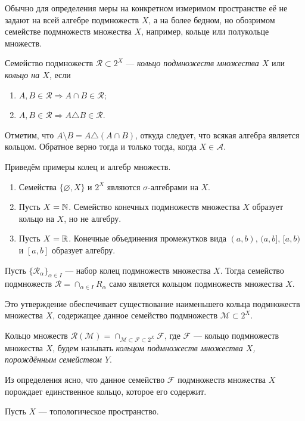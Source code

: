 Обычно для определения меры на конкретном измеримом пространстве её не задают на всей алгебре подмножеств $X$, а на более бедном, но обозримом семействе подмножеств множества $X$, например, кольце или полукольце множеств.
\begin{defin}
	Семейство подмножеств $\mathcal{R}\subset 2^X$ --- \textit{кольцо подмножеств множества $X$} или \textit{кольцо на $X$}, если
	\begin{enumerate}
		\item $A,B\in\mathcal{R}\Rightarrow A\cap B\in\mathcal{R}$;
		\item $A,B\in\mathcal{R}\Rightarrow A\triangle B\in\mathcal{R}$.
	\end{enumerate}
\end{defin}
Отметим, что $A\setminus B=A\triangle(A\cap B)$, откуда следует, что всякая алгебра является кольцом. Обратное верно тогда и только тогда, когда $X\in\mathcal{A}$.

Приведём примеры колец и алгебр множеств.
\begin{enumerate}
	\item Семейства $\{\varnothing, X\}$ и $2^X$ являются $\sigma$-алгебрами на $X$.
	\item Пусть $X=\mathbb {N}$. Семейство конечных подмножеств множества $X$ образует кольцо на $X$, но не алгебру.
	\item Пусть $X=\mathbb {R}$. Конечные объединения промежутков вида $(a,b)$, $(a,b]$, $[a,b)$ и $[a,b]$ образует алгебру.
\end{enumerate}

\begin{prop}
	Пусть $\{\mathcal{R}_{\alpha}\}_{\alpha\in I}$ --- набор колец подмножеств множества $X$. Тогда семейство подмножеств $\mathcal{R}=\displaystyle\cap_{\alpha\in I} R_{\alpha}$ само является кольцом подмножеств множества $X$.
\end{prop}
Это утверждение обеспечивает существование наименьшего кольца подмножеств множества $X$, содержащее данное семейство подмножеств $\mathcal{M}\subset 2^X$.
\begin{defin}
	Кольцо множеств $\mathcal{R}(\mathcal{M})=\displaystyle\cap_{\mathcal{M}\subset\mathcal{F}\subset 2^X} \mathcal{F}$, где $\mathcal{F}$ --- кольцо подмножеств множества $X$, будем называть \textit{кольцом подмножеств множества $X$, порождённым семейством $Y$}. 
\end{defin}
Из определения ясно, что данное семейство $\mathcal{F}$ подмножеств множества $X$ порождает единственное кольцо, которое его содержит.
\begin{defin}
	Пусть $X$ --- топологическое пространство. 
\end{defin}

